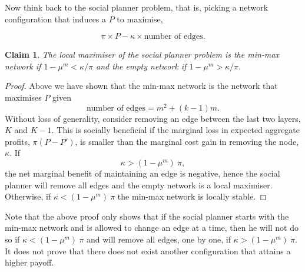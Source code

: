 \documentclass[american, abstract=on]{scrartcl}
\theoremstyle{plain}
\newtheorem{claim}{Claim}
\begin{document}
Now think back to the social planner problem, that is, picking a network configuration that induces a $P$ to maximise,

\begin{equation}
    \pi \times P - \kappa \times \text{number of edges}.
\end{equation}

\begin{claim}
    The local maximiser of the social planner problem is the min-max network if $1 - \mu^m < \kappa / \pi$ and the empty network if $1 - \mu^m > \kappa / \pi$.
\end{claim}

\begin{proof}
    Above we have shown that the min-max network is the network that maximises $P$ given \begin{equation}
        \text{number of edges} = m^2 + (k - 1) m.
    \end{equation}
    Without loss of generality, consider removing an edge between the last two layers, $K$ and $K - 1$. This is socially beneficial if the marginal loss in expected aggregate profits, $\pi (P - P')$, is smaller than the marginal cost gain in removing the node, $\kappa$. If \begin{equation}
        \kappa > (1 - \mu^m) \ \pi,
    \end{equation} the net marginal benefit of maintaining an edge is negative, hence the social planner will remove all edges and the empty network is a local maximiser. Otherwise, if $\kappa < (1 - \mu^m) \ \pi$ the min-max network is locally stable.
\end{proof}

Note that the above proof only shows that if the social planner starts with the min-max network and is allowed to change an edge at a time, then he will not do so if $\kappa < (1 - \mu^m) \ \pi$ and will remove all edges, one by one, if $\kappa > (1 - \mu^m) \ \pi$. It does not prove that there does not exist another configuration that attains a higher payoff.
\end{document}
